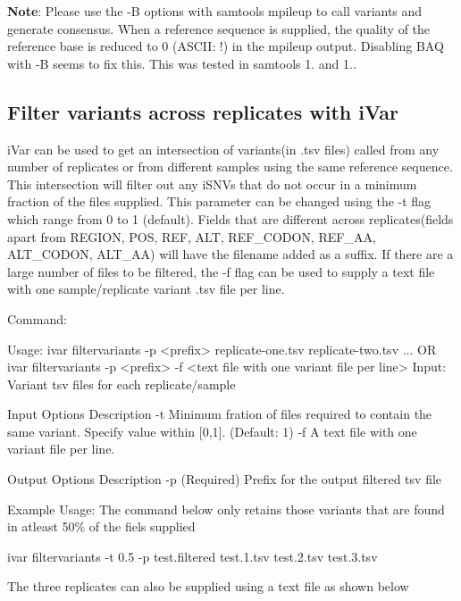 {\bfseries Note}\+: Please use the -\/B options with {\ttfamily samtools mpileup} to call variants and generate consensus. When a reference sequence is supplied, the quality of the reference base is reduced to 0 (A\+S\+C\+II\+: !) in the mpileup output. Disabling B\+AQ with -\/B seems to fix this. This was tested in samtools 1. and 1..\hypertarget{manualpage_autotoc_md18}{}\subsection{Filter variants across replicates with i\+Var}\label{manualpage_autotoc_md18}
i\+Var can be used to get an intersection of variants(in .tsv files) called from any number of replicates or from different samples using the same reference sequence. This intersection will filter out any i\+S\+N\+Vs that do not occur in a minimum fraction of the files supplied. This parameter can be changed using the {\ttfamily -\/t} flag which range from 0 to 1 (default). Fields that are different across replicates(fields apart from R\+E\+G\+I\+O\+N, P\+O\+S, R\+E\+F, A\+L\+T, R\+E\+F\+\_\+\+C\+O\+D\+O\+N, R\+E\+F\+\_\+\+A\+A, A\+L\+T\+\_\+\+C\+O\+D\+O\+N, A\+L\+T\+\_\+\+A\+A) will have the filename added as a suffix. If there are a large number of files to be filtered, the {\ttfamily -\/f} flag can be used to supply a text file with one sample/replicate variant .tsv file per line.

Command\+: 
\begin{DoxyCode}
Usage: ivar filtervariants -p <prefix> replicate-one.tsv replicate-two.tsv ... OR ivar filtervariants -p
       <prefix> -f <text file with one variant file per line> 
Input: Variant tsv files for each replicate/sample

Input Options    Description
           -t    Minimum fration of files required to contain the same variant. Specify value within [0,1].
       (Default: 1)
           -f    A text file with one variant file per line.

Output Options   Description
           -p    (Required) Prefix for the output filtered tsv file
\end{DoxyCode}


Example Usage\+: The command below only retains those variants that are found in atleast 50\% of the fiels supplied 
\begin{DoxyCode}
ivar filtervariants -t 0.5 -p test.filtered test.1.tsv test.2.tsv test.3.tsv
\end{DoxyCode}


The three replicates can also be supplied using a text file as shown below


